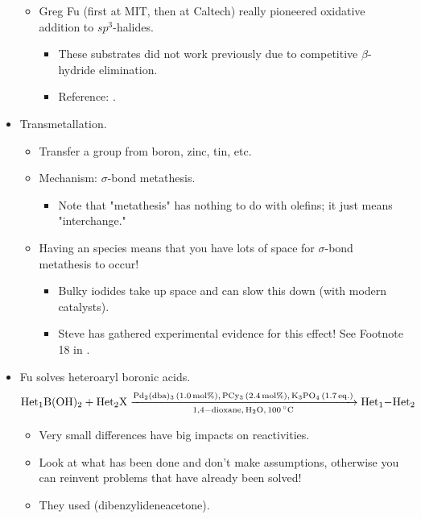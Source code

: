 \documentclass[../notes.tex]{subfiles}
\begin{document}
\begin{itemize}
\begin{itemize}
        \item Greg Fu (first at MIT, then at Caltech) really pioneered oxidative addition to $sp^3$-halides.
        \begin{itemize}
            \item These substrates did not work previously due to competitive $\beta$-hydride elimination.
            \item Reference: \textcite{bib:FuAlkyl}.
        \end{itemize}
    \end{itemize}
    \item Transmetallation.
    \begin{itemize}
        \item Transfer a group from boron, zinc, tin, etc.
        \item Mechanism: $\sigma$-bond metathesis.
        \begin{itemize}
            \item Note that "metathesis" has nothing to do with olefins; it just means "interchange."
        \end{itemize}
        \item Having an  species means that you have lots of space for $\sigma$-bond metathesis to occur!
        \begin{itemize}
            \item Bulky iodides take up space and can slow this down (with modern catalysts).
            \item Steve has gathered experimental evidence for this effect! See Footnote 18 in \textcite{bib:BuchwaldTransmetal}.
        \end{itemize}
    \end{itemize}
    \item Fu solves heteroaryl boronic acids.
    \begin{equation*}
        \ce{Het1B(OH)2 + Het2X ->[Pd2(dba)3 (1.0 mol\%), PCy3 (2.4 mol\%), K3PO4 (1.7 {eq.})][1,4-dioxane, H2O, \SI{100}{\celsius}] Het1-Het2}
    \end{equation*}
    \begin{itemize}
        \item Very small differences have big impacts on reactivities.
        \item Look at what has been done and don't make assumptions, otherwise you can reinvent problems that have already been solved!
        \item They used  (dibenzylideneacetone).

\end{itemize}
\end{itemize}
\end{document}
